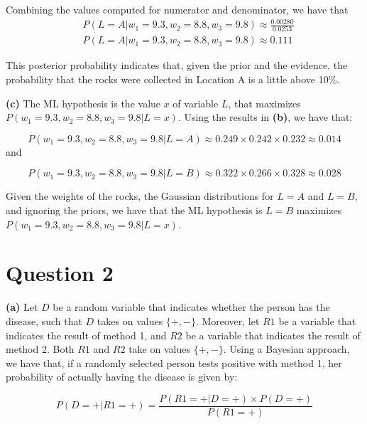 \documentclass[leqno]{article}
\begin{document}
\noindent Combining the values computed for numerator and denominator, we have that
\begin{equation*}
\begin{split}
&P(L = A| w_1 = 9.3, w_2 = 8.8, w_3 = 9.8) \approx \frac{0.00280}{0.0253}
\\
&P(L = A| w_1 = 9.3, w_2 = 8.8, w_3 = 9.8) \approx 0.111
\end{split}
\end{equation*}

\noindent This posterior probability indicates that, given the prior and the evidence, the probability that the rocks were collected in Location A is a little above 10\%.

\noindent \textbf{(c)} The ML hypothesis is the value $x$ of variable $L$, that maximizes $P(w_1 = 9.3, w_2 = 8.8, w_3 = 9.8| L = x)$. Using the results in
\textbf{(b)}, we have that:

\begin{equation*}
P(w_1 = 9.3, w_2 = 8.8, w_3 = 9.8| L = A) \approx 0.249 \times 0.242 \times 0.232 \approx 0.014
\end{equation*}
and

\begin{equation*}
P(w_1 = 9.3, w_2 = 8.8, w_3 = 9.8| L = B) \approx 0.322 \times 0.266 \times 0.328 \approx 0.028
\end{equation*}

\noindent Given the weights of the rocks, the Gaussian distributions for $L = A$ and $L = B$, and ignoring the priors, we have that
the ML hypothesis is $L = B$ maximizes $P(w_1 = 9.3, w_2 = 8.8, w_3 = 9.8| L = x)$.

\section*{Question 2}

\noindent \textbf{(a)} Let $D$ be a random variable that indicates whether the person has the disease,
such that $D$ takes on values $\{+, -\}$. Moreover, let $R1$ be a variable that indicates the
result of method 1, and $R2$ be a variable that indicates the result of method 2. Both $R1$ and
$R2$ take on values $\{+, -\}$. Using a Bayesian approach, we have that, if a randomly selected
person tests positive with method 1, her probability of actually having the disease is
given by:

\begin{equation*}
P(D = +|R1 = +) = \frac{P(R1 = +|D = +) \times P(D = +)}{P(R1 = +)}
\end{equation*}  
\end{document}
